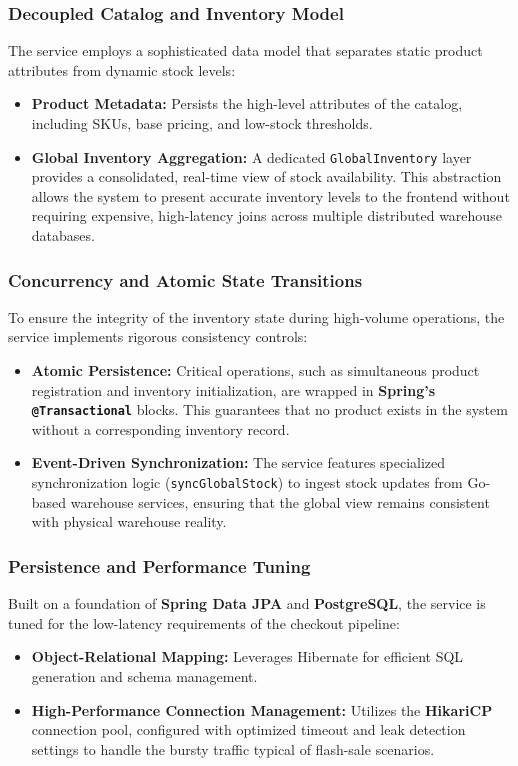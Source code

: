 \documentclass[12pt,a4paper]{report}
\begin{document}
\subsubsection{Decoupled Catalog and Inventory Model}
The service employs a sophisticated data model that separates static product attributes from dynamic stock levels:
\begin{itemize}
    \item \textbf{Product Metadata:} Persists the high-level attributes of the catalog, including SKUs, base pricing, and low-stock thresholds.
    \item \textbf{Global Inventory Aggregation:} A dedicated \texttt{GlobalInventory} layer provides a consolidated, real-time view of stock availability. This abstraction allows the system to present accurate inventory levels to the frontend without requiring expensive, high-latency joins across multiple distributed warehouse databases.
\end{itemize}

\subsubsection{Concurrency and Atomic State Transitions}
To ensure the integrity of the inventory state during high-volume operations, the service implements rigorous consistency controls:
\begin{itemize}
    \item \textbf{Atomic Persistence:} Critical operations, such as simultaneous product registration and inventory initialization, are wrapped in \textbf{Spring's \texttt{@Transactional}} blocks. This guarantees that no product exists in the system without a corresponding inventory record.
    \item \textbf{Event-Driven Synchronization:} The service features specialized synchronization logic (\texttt{syncGlobalStock}) to ingest stock updates from Go-based warehouse services, ensuring that the global view remains consistent with physical warehouse reality.
\end{itemize}

\subsubsection{Persistence and Performance Tuning}
Built on a foundation of \textbf{Spring Data JPA} and \textbf{PostgreSQL}, the service is tuned for the low-latency requirements of the checkout pipeline:
\begin{itemize}
    \item \textbf{Object-Relational Mapping:} Leverages Hibernate for efficient SQL generation and schema management.
    \item \textbf{High-Performance Connection Management:} Utilizes the \textbf{HikariCP} connection pool, configured with optimized timeout and leak detection settings to handle the bursty traffic typical of flash-sale scenarios.
\end{itemize}
\end{document}

